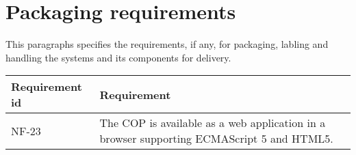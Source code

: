 



\newpage
\label{sec_nonFunc7}
\section{Packaging requirements}
This paragraphs specifies the requirements, if any, for packaging, labling and handling the systems and its components for delivery.

\begin{longtable}{| p{3.2cm} |  p{10cm} | }
	\hline
	\textbf{Requirement id} &  \textbf{Requirement } \\
	\hline
	NF-23 & The COP is available as a web application in a browser supporting ECMAScript 5 and HTML5. \\
	\hline
\end{longtable}